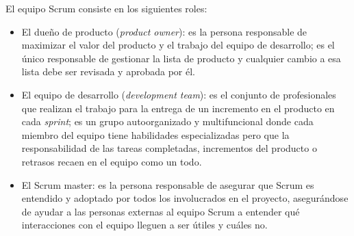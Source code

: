 El equipo Scrum consiste en los siguientes roles:
\begin{itemize}
	\item El dueño de producto (\textit{product owner}): es la persona responsable de maximizar el valor del producto y el trabajo del equipo de desarrollo; es el único responsable de gestionar la lista de producto y cualquier cambio a esa lista debe ser revisada y aprobada por él.
	\item El equipo de desarrollo (\textit{development team}): es el conjunto de profesionales que realizan el trabajo para la entrega de un incremento en el producto en cada \textit{sprint}; es un grupo autoorganizado y multifuncional donde cada miembro del equipo tiene habilidades especializadas pero que la responsabilidad de las tareas completadas, incrementos del producto o retrasos recaen en el equipo como un todo.
	\item  El Scrum master: es la persona responsable de asegurar que Scrum es entendido y adoptado por todos los involucrados en el proyecto, asegurándose de ayudar a las personas externas al equipo Scrum a entender qué interacciones con el equipo lleguen a ser útiles y cuáles no.
\end{itemize}
